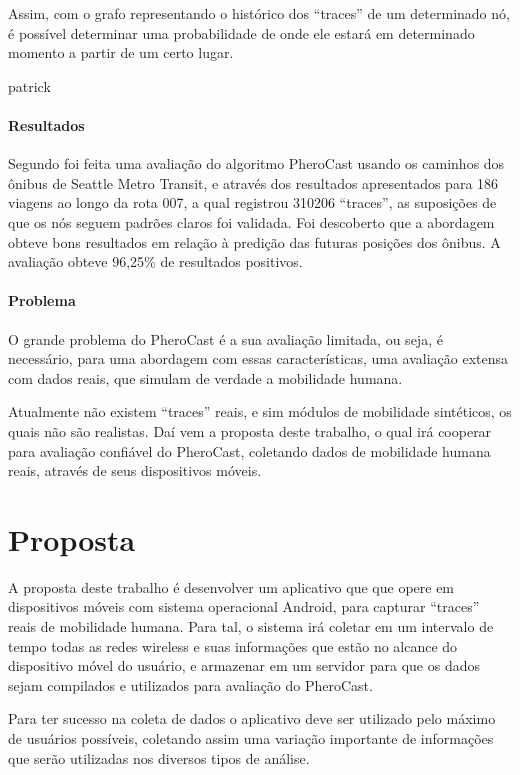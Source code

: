 \documentclass[12pt, %
openright, 
oneside,
a4paper,
brazil]{facom-ufu-abntex2}
\begin{document}
Assim, com o grafo representando o histórico dos ``traces'' de um determinado nó, é possível determinar uma probabilidade de onde ele estará em determinado momento a partir de um certo lugar.

patrick

\paragraph{Resultados}
Segundo \cite{fynn} foi feita uma avaliação do algoritmo PheroCast usando os caminhos dos ônibus de Seattle Metro Transit, e através dos resultados apresentados para 186 viagens ao longo da rota 007, a qual registrou 310206 ``traces'', as suposições de que os nós seguem padrões claros foi validada. Foi descoberto que a abordagem obteve bons resultados em relação à predição das futuras posições dos ônibus. A avaliação obteve 96,25\% de resultados positivos. 


\paragraph{Problema}
O grande problema do PheroCast é a sua avaliação limitada, ou seja, é necessário, para uma abordagem com essas características, uma avaliação extensa com dados reais, que simulam de verdade a mobilidade humana. 

Atualmente não existem ``traces'' reais, e sim módulos de mobilidade sintéticos, os quais não são realistas. Daí vem a proposta deste trabalho, o qual irá cooperar para avaliação confiável do PheroCast, coletando dados de mobilidade humana reais, através de seus dispositivos móveis.

\section{Proposta}
A proposta deste trabalho é desenvolver um aplicativo que que opere em dispositivos móveis com sistema operacional Android, para capturar ``traces'' reais de mobilidade humana. Para tal, o sistema irá coletar em um intervalo de tempo todas as redes wireless e suas informações que estão no alcance do dispositivo móvel do usuário, e armazenar em um servidor para que os dados sejam compilados e utilizados para avaliação do PheroCast.

Para ter sucesso na coleta de dados o aplicativo deve ser utilizado pelo máximo de usuários possíveis, coletando assim uma variação importante de informações que serão utilizadas nos diversos tipos de análise. 
\end{document}

